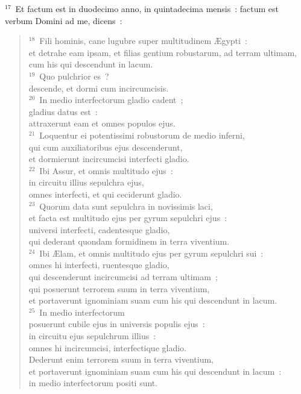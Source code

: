 ${}^{17}$~Et factum est in duodecimo anno, in quintadecima mensis~: factum est verbum Domini ad me, dicens~:
\begin{verse}${}^{18}$~Fili hominis, cane lugubre super multitudinem \AE gypti~:\\ et detrahe eam ipsam, et filias gentium robustarum, ad terram ultimam,\\ cum his qui descendunt in lacum.\\
${}^{19}$~Quo pulchrior es~?\\ descende, et dormi cum incircumcisis.\\
${}^{20}$~In medio interfectorum gladio cadent~;\\ gladius datus est~:\\ attraxerunt eam et omnes populos ejus.\\
${}^{21}$~Loquentur ei potentissimi robustorum de medio inferni,\\ qui cum auxiliatoribus ejus descenderunt,\\ et dormierunt incircumcisi interfecti gladio.\\
${}^{22}$~Ibi Assur, et omnis multitudo ejus~:\\ in circuitu illius sepulchra ejus,\\ omnes interfecti, et qui ceciderunt gladio.\\
${}^{23}$~Quorum data sunt sepulchra in novissimis laci,\\ et facta est multitudo ejus per gyrum sepulchri ejus~:\\ universi interfecti, cadentesque gladio,\\ qui dederant quondam formidinem in terra viventium.\\
${}^{24}$~Ibi \AE lam, et omnis multitudo ejus per gyrum sepulchri sui~:\\ omnes hi interfecti, ruentesque gladio,\\ qui descenderunt incircumcisi ad terram ultimam~;\\ qui posuerunt terrorem suum in terra viventium,\\ et portaverunt ignominiam suam cum his qui descendunt in lacum.\\
${}^{25}$~In medio interfectorum\\ posuerunt cubile ejus in universis populis ejus~:\\ in circuitu ejus sepulchrum illius~:\\ omnes hi incircumcisi, interfectique gladio.\\ Dederunt enim terrorem suum in terra viventium,\\ et portaverunt ignominiam suam cum his qui descendunt in lacum~:\\ in medio interfectorum positi sunt.\\

\end{verse}

